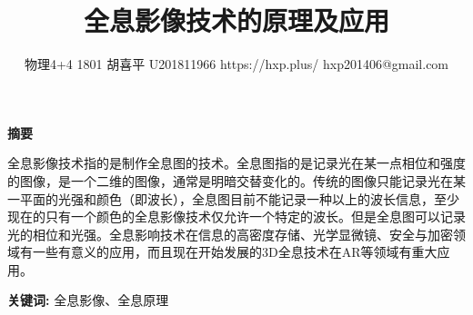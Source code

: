 \documentclass{article}
\author{物理4+4 1801 \quad 胡喜平 \quad U201811966 \quad https://hxp.plus/ \quad hxp201406@gmail.com}
\date{}
\title{全息影像技术的原理及应用}
\providecommand{\keywords}[1]
{
  \textbf{关键词:} #1
}
\begin{document}
\maketitle

\begin{center}
  \Large\textbf{摘要}
\end{center}

全息影像技术指的是制作全息图的技术。全息图指的是记录光在某一点相位和强度的图像，是一个二维的图像，通常是明暗交替变化的。传统的图像只能记录光在某一平面的光强和颜色（即波长），全息图目前不能记录一种以上的波长信息，至少现在的只有一个颜色的全息影像技术仅允许一个特定的波长。但是全息图可以记录光的相位和光强。全息影响技术在信息的高密度存储、光学显微镜、安全与加密领域有一些有意义的应用，而且现在开始发展的3D全息技术在AR等领域有重大应用。
\newline\newline
\noindent\!\!\!\!
\keywords{全息影像、全息原理}
\end{document}
